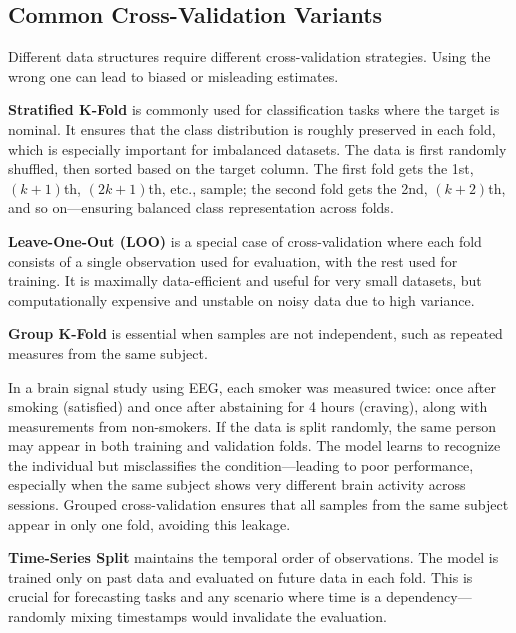 \documentclass[12pt,openany]{book}
\begin{document}
\subsection{Common Cross-Validation Variants}

Different data structures require different cross-validation strategies. Using the wrong one can lead to biased or misleading estimates. \newline

\textbf{Stratified K-Fold} is commonly used for classification tasks where the target is nominal. It ensures that the class distribution is roughly preserved in each fold, which is especially important for imbalanced datasets. The data is first randomly shuffled, then sorted based on the target column. The first fold gets the 1st, $(k+1)$th, $(2k+1)$th, etc., sample; the second fold gets the 2nd, $(k+2)$th, and so on—ensuring balanced class representation across folds. \newline

\textbf{Leave-One-Out (LOO)} is a special case of cross-validation where each fold consists of a single observation used for evaluation, with the rest used for training. It is maximally data-efficient and useful for very small datasets, but computationally expensive and unstable on noisy data due to high variance. \newline

\textbf{Group K-Fold} is essential when samples are not independent, such as repeated measures from the same subject.

\begin{examplebox}
In a brain signal study using EEG, each smoker was measured twice: once after smoking (satisfied) and once after abstaining for 4 hours (craving), along with measurements from non-smokers. If the data is split randomly, the same person may appear in both training and validation folds. The model learns to recognize the individual but misclassifies the condition—leading to poor performance, especially when the same subject shows very different brain activity across sessions. Grouped cross-validation ensures that all samples from the same subject appear in only one fold, avoiding this leakage.
\end{examplebox}

\textbf{Time-Series Split} maintains the temporal order of observations. The model is trained only on past data and evaluated on future data in each fold. This is crucial for forecasting tasks and any scenario where time is a dependency—randomly mixing timestamps would invalidate the evaluation.
\end{document}
